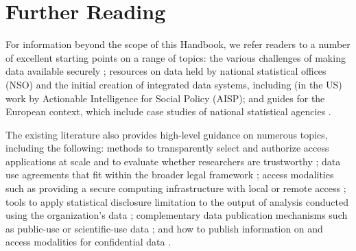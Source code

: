 \hypertarget{further-reading}{%
\section{Further Reading}\label{further-reading}}

For information beyond the scope of this Handbook, we refer readers to a number of excellent starting points on a range of topics: the various challenges of making data available securely \citep[see][]{reuter2010, harron2017, adrfnetwork2018, futureofprivacyforum2017}; resources on data held by national statistical offices (NSO) and the initial creation of integrated data systems, including (in the US) work by Actionable Intelligence for Social Policy (AISP); and guides for the European context, which include case studies of national statistical agencies \citep{oecd2014, bujnowska2019}.

The existing literature also provides high-level guidance on numerous topics, including the following: methods to transparently select and authorize access applications at scale and to evaluate whether researchers are trustworthy \citep[for a new approach, see][]{levenstein2018}; data use agreements that fit within the broader legal framework \citep[some limited guidance provided by][]{kanous2015, kuchinke2016, alter2018}; access modalities such as providing a secure computing infrastructure with local or remote access \citep{weinberg2007, vilhuber2013, vilhuber2017}; tools to apply statistical disclosure limitation to the output of analysis conducted using the organization's data \citep{liu2020, dupriez2010, duncan2011}; complementary data publication mechanisms such as public-use or scientific-use data \citep{bujnowska2019}; and how to publish information on and access modalities for confidential data \citep{abowd2012}.

\putbib

